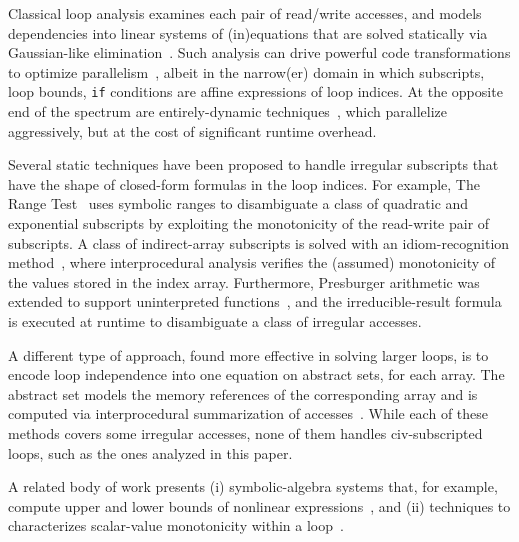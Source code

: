 \documentclass[10pt,nocopyrightspace]{sigplanconf}
\begin{document}
Classical loop analysis examines each pair of read/write accesses, 
and models dependencies into linear systems of (in)equations that are solved
statically  via Gaussian-like elimination~\cite{BanerjeeIneqTest,FeautrierDataflow}. 
Such analysis  can drive powerful code transformations to optimize 
parallelism~\cite{PolyhedralOpt}, albeit in the narrow(er) domain 
in which subscripts, loop bounds, {\tt if} conditions are affine 
expressions of loop indices. At the opposite end of the spectrum 
are entirely-dynamic techniques~\cite{LRPD,OanceaSetCongrDynAn}, 
which parallelize aggressively, but at the cost of significant runtime overhead.

Several static techniques have been proposed to handle irregular subscripts that have
the shape of closed-form formulas in the loop indices. For example, 
The Range Test~\cite{Blume94RangeTest} uses symbolic 
ranges to disambiguate a class of quadratic and  
exponential subscripts by exploiting the monotonicity of the read-write pair 
of subscripts.   A class of indirect-array subscripts is solved with 
an idiom-recognition method~\cite{PaduaDemDrInterproc}, where interprocedural 
analysis verifies the (assumed) monotonicity of the values stored in the 
index array.
%
Furthermore, Presburger arithmetic was extended to support
uninterpreted functions~\cite{Pugh98NonlinPresb}, and the irreducible-result
formula is executed at runtime to disambiguate a class of irregular
accesses. 

A different type of approach, found more effective in
solving larger loops, is to encode loop independence into one equation 
on abstract sets, for each array. The abstract set models the
memory references of the corresponding array and is computed 
via interprocedural summarization of 
accesses~\cite{SUIF,Moon99PredArrDataFlow,SummaryMonot,LMAD}.
While each of these methods covers some irregular accesses,
none of them handles {\sc civ}-subscripted loops,   
such as the ones analyzed in this paper.
%

\enlargethispage{\baselineskip}

A related  body of work presents (i) symbolic-algebra systems that, for example,  
compute upper and lower bounds of nonlinear expressions~\cite{Fahringer97EffSymb},
and (ii) techniques to characterizes scalar-value monotonicity within a 
loop~\cite{VEG,MonStmt}.
\end{document}

